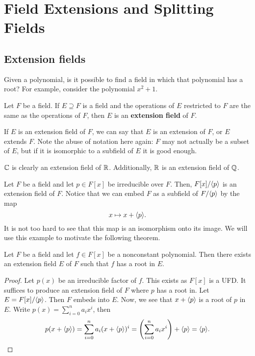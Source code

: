 \documentclass[oneside]{book}
\begin{document}
\chapter{Field Extensions and Splitting Fields}

\section{Extension fields}
Given a polynomial, is it possible to find a field in which that polynomial has
a root? For example, consider the polynomial $x^2 + 1$. 

\begin{definition}
    Let $F$ be a field. If $E \supseteq F$ is a field and the operations of $E$
    restricted to $F$ are the same as the operations of $F$, then $E$ is an
    \textbf{extension field} of $F$.
\end{definition}
If $E$ is an extension field of $F$, we can say that $E$ is an extension of $F$,
or $E$ extends $F$. Note the abuse of notation here again: $F$ may not actually
be a subset of $E$, but if it is isomorphic to a subfield of $E$ it is good
enough.

\begin{example}
    $\mathbb{C}$ is clearly an extension field of $\mathbb{R}$. Additionally, $\mathbb{R}$ is an
    extension field of $\mathbb{Q}$.
\end{example}

\begin{example}
    Let $F$ be a field and let $p \in F[x]$ be irreducible over $F$. Then,
    $F[x]/{ \langle p \rangle }$ is an extension field of $F$. Notice that we can embed $F$ as
    a subfield of $F/{ \langle p \rangle }$ by the map 
    \[
        x \mapsto x + { \langle p \rangle }.
    \]
    It is not too hard to see that this map is an isomorphism onto its image. We
    will use this example to motivate the following theorem.
\end{example}

\begin{theorem}
\label{thm:extension-fields-exist}
    Let $F$ be a field and let $f \in F[x]$ be a nonconstant polynomial. Then
    there exists an extension field $E$ of $F$ such that $f$ has a root in $E$.
\end{theorem}
\begin{proof}
    Let $p(x)$ be an irreducible factor of $f$. This exists as $F[x]$ is a UFD.
    It suffices to produce an extension field of $F$ where $p$ has a root in.
    Let $E = F[x] / { \langle p \rangle }$. Then $F$ embeds into $E$. Now, we see that $x +
    { \langle p \rangle }$ is a root of $p$ in $E$. Write $p(x) = \sum_{i=0}^n a_i x^i$, then 
    \[ 
        p(x + \gen{p}) = \sum_{i=0}^n a_i (x+\gen{p})^i =  \paren{\sum_{i=0}^n a_i x^i} + \gen{p} = \gen{p}.
    \]
\end{proof}
\end{document}

